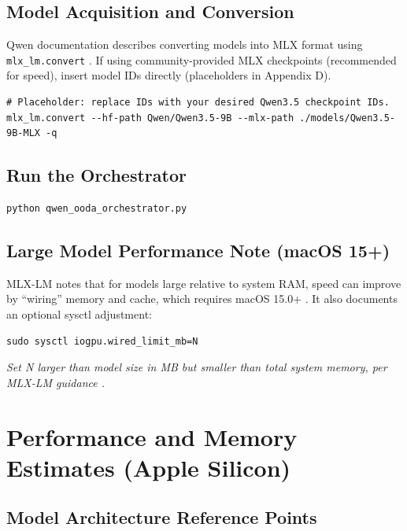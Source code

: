 \documentclass[11pt]{article}
\begin{document}
\subsection{Model Acquisition and Conversion}

Qwen documentation describes converting models into MLX format using \texttt{mlx\_lm.convert} \cite{Qwen_MLXLM_Docs}.
If using community-provided MLX checkpoints (recommended for speed), insert model IDs directly (placeholders in Appendix D).

\begin{lstlisting}[style=base, caption={Convert a Hugging Face model to MLX (placeholder IDs)}]
# Placeholder: replace IDs with your desired Qwen3.5 checkpoint IDs.
mlx_lm.convert --hf-path Qwen/Qwen3.5-9B --mlx-path ./models/Qwen3.5-9B-MLX -q
\end{lstlisting}

\subsection{Run the Orchestrator}

\begin{lstlisting}[style=base, caption={Run orchestrator (example)}]
python qwen_ooda_orchestrator.py
\end{lstlisting}

\subsection{Large Model Performance Note (macOS 15+)}

MLX-LM notes that for models large relative to system RAM, speed can improve by ``wiring'' memory and cache, which requires macOS 15.0+ \cite{MLXLM_Readme}.
It also documents an optional sysctl adjustment:
\begin{lstlisting}[style=base, caption={Optional wired memory limit tweak (read docs; use cautiously)}]
sudo sysctl iogpu.wired_limit_mb=N
\end{lstlisting}
\noindent\textit{Set N larger than model size in MB but smaller than total system memory, per MLX-LM guidance \cite{MLXLM_Readme}.}

\section{Performance and Memory Estimates (Apple Silicon)}

\subsection{Model Architecture Reference Points}
\end{document}

